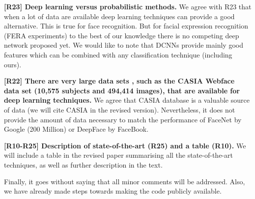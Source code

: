 \documentclass[10pt,twocolumn,letterpaper]{article}
\begin{document}
\textbf{[R23] Deep learning versus probabilistic methods.}
We agree with R23 that when a lot of data are available deep learning techniques can provide a good alternative. This is true for face recognition. But for facial expression recognition (FERA experiments) to the best of our knowledge there is no competing deep network proposed yet. We would like to note that DCNNs provide mainly good features which can be combined with any classification technique (including ours).

\textbf{[R22] There are very large data sets , such as the CASIA Webface data set (10,575 subjects and 494,414 images), that are available for deep learning techniques.} 
We agree that CASIA database is a valuable source of data (we will cite CASIA in the revised version). Nevertheless, it does not provide the amount of data necessary to match the performance of FaceNet by Google (200 Million) or DeepFace by FaceBook. 



\textbf{[R10-R25] Description of state-of-the-art (R25) and a table (R10).} We will include a table in the revised paper summarising all the state-of-the-art techniques, as well as further description in the text.

Finally, it goes without saying that all minor comments will be addressed. Also, we have already made steps towards making the code publicly available.



















{\small


}
\end{document}
